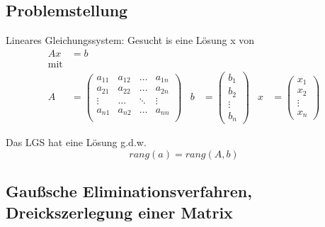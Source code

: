 \documentclass[
	ngerman,
	accentcolor=9c,%
	type=intern,
	marginpar=false
	]{tudapub}
\begin{document}
        \subsection{Problemstellung}
            Lineares Gleichungssystem: Gesucht is eine Lösung x von 
            \begin{align*}
                Ax &= b\\
                \text{mit}\\
                A &= 
                \begin{pmatrix}
                    a_{11} & a_{12} & \dots & a_{1n}\\
                    a_{21} & a_{22} & \dots & a_{2n}\\
                    \vdots & \dots & \ddots & \vdots\\
                    a_{n1} & a_{n2} & \dots & a_{nn}\\
                \end{pmatrix} &
                b &= 
                \begin{pmatrix}
                    b_1\\
                    b_2\\
                    \vdots\\
                    b_n
                \end{pmatrix} &
                x &= 
                \begin{pmatrix}
                    x_1\\
                    x_2\\
                    \vdots\\
                    x_n
                \end{pmatrix}
            \end{align*}
            \begin{definition}
                Das LGS hat eine Lösung g.d.w.
                \begin{equation*}
                    rang(a) = rang(A,b)
                \end{equation*}
            \end{definition}
        \subsection{Gaußsche Eliminationsverfahren, Dreickszerlegung einer Matrix}
\end{document}

